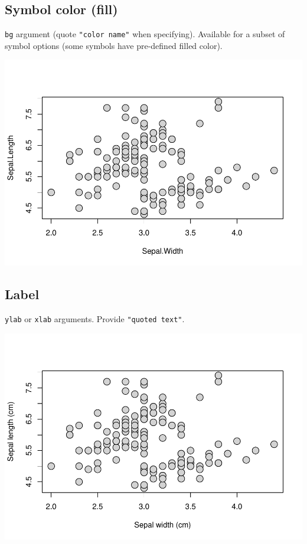 \documentclass[
]{book}
\begin{document}
\hypertarget{symbol-color-fill}{%
\subsection{Symbol color (fill)}\label{symbol-color-fill}}

\texttt{bg} argument (quote \texttt{"color\ name"} when specifying). Available for a subset of symbol options (some symbols have pre-defined filled color).

\includegraphics{_main_files/figure-latex/unnamed-chunk-27-1.pdf}

\hypertarget{label}{%
\subsection{Label}\label{label}}

\texttt{ylab} or \texttt{xlab} arguments. Provide \texttt{"quoted\ text"}.

\includegraphics{_main_files/figure-latex/unnamed-chunk-28-1.pdf}
\end{document}
